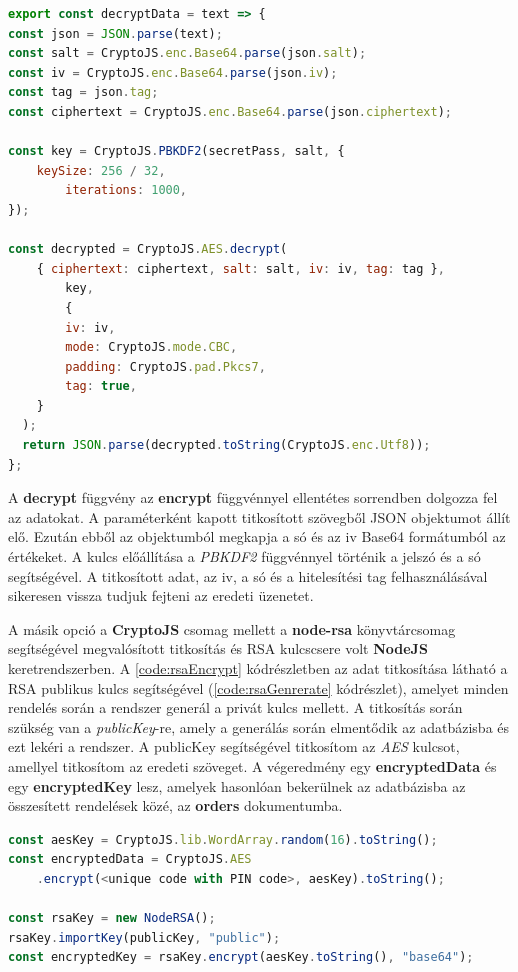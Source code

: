 \begin{lstlisting}[caption={Visszafejtés példakód.}, captionpos=b, language = JavaScript, label={code:decryption}]
export const decryptData = text => {
const json = JSON.parse(text);
const salt = CryptoJS.enc.Base64.parse(json.salt);
const iv = CryptoJS.enc.Base64.parse(json.iv);
const tag = json.tag;
const ciphertext = CryptoJS.enc.Base64.parse(json.ciphertext);

const key = CryptoJS.PBKDF2(secretPass, salt, {
	keySize: 256 / 32,
    	iterations: 1000,
});

const decrypted = CryptoJS.AES.decrypt(
  	{ ciphertext: ciphertext, salt: salt, iv: iv, tag: tag },
    	key,
    	{
     	iv: iv,
      	mode: CryptoJS.mode.CBC,
      	padding: CryptoJS.pad.Pkcs7,
      	tag: true,
    }
  );
  return JSON.parse(decrypted.toString(CryptoJS.enc.Utf8));
};
\end{lstlisting}

A \textbf{decrypt} függvény az \textbf{encrypt} függvénnyel ellentétes sorrendben dolgozza fel az adatokat. A paraméterként kapott titkosított szövegből JSON objektumot állít elő. Ezután ebből az objektumból megkapja a só és az iv Base64 formátumból az értékeket. A kulcs előállítása a \textit{PBKDF2} függvénnyel történik a jelszó és a só segítségével. A titkosított adat, az iv, a só és a hitelesítési tag felhasználásával sikeresen vissza tudjuk fejteni az eredeti üzenetet.

A másik opció a \textbf{CryptoJS} csomag mellett a \textbf{node-rsa} könyvtárcsomag segítségével megvalósított titkosítás és RSA kulcscsere volt \textbf{NodeJS} keretrendszerben. A \ref{code:rsaEncrypt} kódrészletben az adat titkosítása látható a RSA publikus kulcs segítségével (\ref{code:rsaGenrerate} kódrészlet), amelyet minden rendelés során a rendszer generál a privát kulcs mellett. A titkosítás során szükség van a \textit{publicKey}-re, amely a generálás során elmentődik az adatbázisba és ezt lekéri a rendszer. A publicKey segítségével titkosítom az \textit{AES} kulcsot, amellyel titkosítom az eredeti szöveget. A végeredmény egy \textbf{encryptedData} és egy \textbf{encryptedKey} lesz, amelyek hasonlóan bekerülnek az adatbázisba az összesített rendelések közé, az \textbf{orders} dokumentumba.

\begin{lstlisting}[caption={RSA kulcscsere és titkosítás.}, captionpos=b, language = JavaScript, label={code:rsaEncrypt}]
const aesKey = CryptoJS.lib.WordArray.random(16).toString();
const encryptedData = CryptoJS.AES
	.encrypt(<unique code with PIN code>, aesKey).toString();

const rsaKey = new NodeRSA();
rsaKey.importKey(publicKey, "public");
const encryptedKey = rsaKey.encrypt(aesKey.toString(), "base64");
\end{lstlisting}

